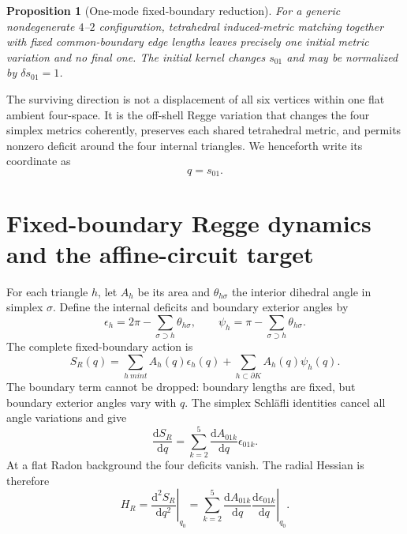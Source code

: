 \documentclass[11pt]{article}
\newtheorem{proposition}[theorem]{Proposition}
\theoremstyle{definition}
\theoremstyle{remark}
\newcommand{\dd}{\mathrm d}
\begin{document}
\begin{proposition}[One-mode fixed-boundary reduction]
For a generic nondegenerate $4$--$2$ configuration, tetrahedral induced-metric matching together with fixed common-boundary edge lengths leaves precisely one initial metric variation and no final one.  The initial kernel changes $s_{01}$ and may be normalized by $\delta s_{01}=1$.
\end{proposition}

The surviving direction is not a displacement of all six vertices within one flat ambient four-space.  It is the off-shell Regge variation that changes the four simplex metrics coherently, preserves each shared tetrahedral metric, and permits nonzero deficit around the four internal triangles.  We henceforth write its coordinate as
\begin{equation}
 q=s_{01}.
 \label{eq:qdef}
\end{equation}

\section{Fixed-boundary Regge dynamics and the affine-circuit target}

For each triangle $h$, let $A_h$ be its area and $\theta_{h\sigma}$ the interior dihedral angle in simplex $\sigma$.  Define the internal deficits and boundary exterior angles by
\begin{equation}
 \epsilon_h=2\pi-\sum_{\sigma\supset h}\theta_{h\sigma},\qquad
 \psi_h=\pi-\sum_{\sigma\supset h}\theta_{h\sigma}.
\end{equation}
The complete fixed-boundary action is
\begin{equation}
 S_R(q)=\sum_{h\ {
m int}}A_h(q)\epsilon_h(q)
       +\sum_{h\subset\partial K}A_h(q)\psi_h(q).
 \label{eq:reggeaction}
\end{equation}
The boundary term cannot be dropped: boundary lengths are fixed, but boundary exterior angles vary with $q$.  The simplex Schl\"afli identities cancel all angle variations and give
\begin{equation}
 \frac{\dd S_R}{\dd q}
 =\sum_{k=2}^{5}\frac{\dd A_{01k}}{\dd q}\epsilon_{01k}.
 \label{eq:reggeeom}
\end{equation}
At a flat Radon background the four deficits vanish.  The radial Hessian is therefore
\begin{equation}
 H_R=\left.\frac{\dd^2 S_R}{\dd q^2}\right|_{q_0}
 =\left.\sum_{k=2}^{5}\frac{\dd A_{01k}}{\dd q}
              \frac{\dd\epsilon_{01k}}{\dd q}\right|_{q_0}.
 \label{eq:reggehessian}
\end{equation}
\end{document}

